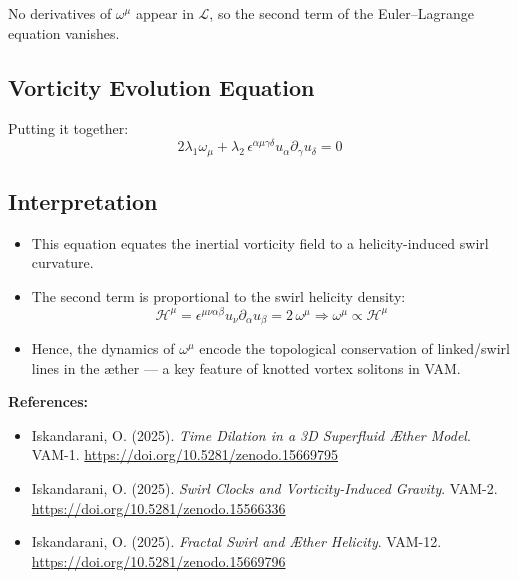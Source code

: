 \documentclass[twocolumn,aps,pre,floatfix,nofootinbib]{revtex4-2}
\begin{document}
    No derivatives of \( \omega^\mu \) appear in \( \mathcal{L} \), so the second term of the Euler–Lagrange equation vanishes.

    \subsection*{Vorticity Evolution Equation}

    Putting it together:
    \begin{equation}
        \boxed{
            2 \lambda_1 \omega_\mu
            + \lambda_2\, \epsilon^{\alpha\mu\gamma\delta} u_\alpha \partial_\gamma u_\delta
            = 0
        }
    \end{equation}

    \subsection*{Interpretation}

    \begin{itemize}
        \item This equation equates the inertial vorticity field to a helicity-induced swirl curvature.
        \item The second term is proportional to the swirl helicity density:
        \[
            \mathcal{H}^\mu = \epsilon^{\mu\nu\alpha\beta} u_\nu \partial_\alpha u_\beta = 2\, \omega^\mu
            \Rightarrow \omega^\mu \propto \mathcal{H}^\mu
        \]
        \item Hence, the dynamics of \( \omega^\mu \) encode the topological conservation of linked/swirl lines in the æther — a key feature of knotted vortex solitons in VAM.
    \end{itemize}

    \vspace{1em}
    \noindent
    \textbf{References:}
    \begin{itemize}
        \item Iskandarani, O. (2025). \textit{Time Dilation in a 3D Superfluid Æther Model}. VAM-1. \url{https://doi.org/10.5281/zenodo.15669795}
        \item Iskandarani, O. (2025). \textit{Swirl Clocks and Vorticity-Induced Gravity}. VAM-2. \url{https://doi.org/10.5281/zenodo.15566336}
        \item Iskandarani, O. (2025). \textit{Fractal Swirl and Æther Helicity}. VAM-12. \url{https://doi.org/10.5281/zenodo.15669796}
    \end{itemize}

    

\end{document}
